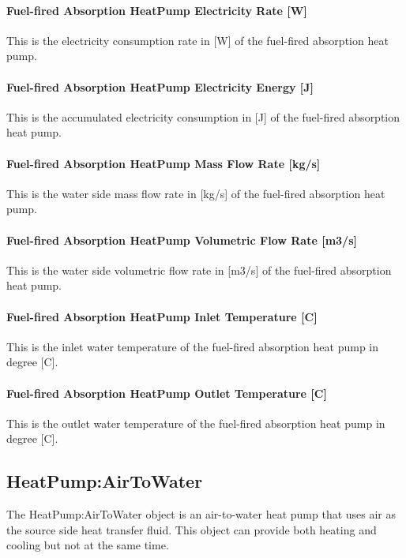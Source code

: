 \paragraph{Fuel-fired Absorption HeatPump Electricity Rate [W]}
This is the electricity consumption rate in [W] of the fuel-fired absorption heat pump.

\paragraph{Fuel-fired Absorption HeatPump Electricity Energy [J]}
This is the accumulated electricity consumption in [J] of the fuel-fired absorption heat pump.

\paragraph{Fuel-fired Absorption HeatPump Mass Flow Rate [kg/s]}
This is the water side mass flow rate in [kg/s] of the fuel-fired absorption heat pump.

\paragraph{Fuel-fired Absorption HeatPump Volumetric Flow Rate [m3/s]}
This is the water side volumetric flow rate in [m3/s] of the fuel-fired absorption heat pump.

\paragraph{Fuel-fired Absorption HeatPump Inlet Temperature [C]}
This is the inlet water temperature of the fuel-fired absorption heat pump in degree [C].

\paragraph{Fuel-fired Absorption HeatPump Outlet Temperature [C]}
This is the outlet water temperature of the fuel-fired absorption heat pump in degree [C].

\subsection{HeatPump:AirToWater}\label{plhp_air_to_water}

The HeatPump:AirToWater object is an air-to-water heat pump that uses air as the
source side heat transfer fluid. This object can provide both heating and
cooling but not at the same time.

